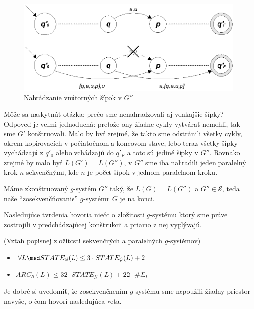 \begin{dokaz}
\begin{enumerate}
  \begin{figure}[!ht]
    \centering
    \includegraphics{./OBRAZKY/GSYSTEMS/G_S_P_2}
    \caption{Nahrádzanie vnútorných šípok v $G''$} \label{gs_obr_gps2}
  \end{figure}

  Môže sa naskytnúť otázka: prečo sme nenahradzovali aj vonkajšie
  šípky? Odpoveď je veľmi jednoduchá: pretože ony žiadne cykly
  vytvárať nemohli, tak sme $G'$ konštruovali. Malo by byť zrejmé,
  že takto sme odstránili všetky cykly, okrem kopírovacích v
  počiatočnom a koncovom stave, lebo teraz všetky šípky vychádzajú z
  $q'_0$ alebo vchádzajú do $q'_F$ a toto sú jediné šípky v $G''$.
  Rovnako zrejmé by malo byť $L(G')=L(G'')$, v $G''$ sme iba
  nahradili jeden paralelný krok $n$ sekvenčnými, kde $n$ je počet
  šípok v jednom paralelnom kroku.
\end{enumerate}
Máme zkonštruovaný $g$-systém $G''$ taký, že $L(G)=L(G'')$ a
$G''\in\mathcal{S}$, teda naše ``zosekvenčňovanie'' $g$-systému
$G$ je na konci.
\end{dokaz}

Nasledujúce tvrdenia hovoria niečo o zložitosti $g$-systému ktorý
sme práve zostrojili v pred\-chá\-dza\-jú\-cej konštrukcii a
priamo z nej vyplývajú.

\begin{veta}
(Vzťah popisnej zložitosti sekvenčných a paralelných $g$-systémov)
\begin{itemize}
  \item $\forall L\med STATE_{\mathcal{S}}(L)\leq
  3\cdot STATE_{\mathcal{G}}(L)+2$
  \item $ARC_{\mathcal{S}}(L)\leq 32\cdot STATE_{\mathcal{G}}(L)+22\cdot\#\Sigma_L$
\end{itemize}
\end{veta}

Je dobré si uvedomiť, že zosekvenčnením $g$-systému sme nepoužili
žiadny priestor navyše, o čom hovorí nasledujúca veta.

